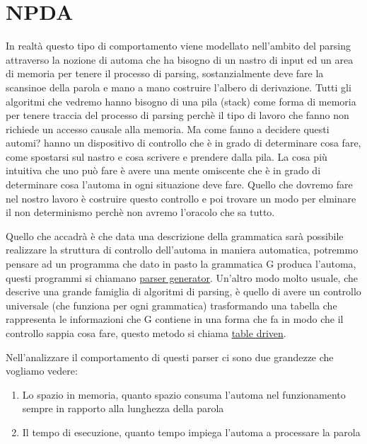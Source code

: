 \section{NPDA}
In realtà questo tipo di comportamento viene modellato nell'ambito del parsing attraverso la nozione di automa che ha bisogno di un nastro di input ed un area di memoria per tenere il processo di parsing, sostanzialmente deve fare la scansinoe della parola e mano a mano costruire l'albero di derivazione. Tutti gli algoritmi che vedremo hanno bisogno di una pila (stack) come forma di memoria per tenere traccia del processo di parsing perchè il tipo di lavoro che fanno non richiede un accesso causale alla memoria. Ma come fanno a decidere questi automi? hanno un dispositivo di controllo che è in grado di determinare cosa fare, come spostarsi sul nastro e cosa scrivere e prendere dalla pila. La cosa più intuitiva che uno può fare è avere una mente omiscente che è in grado di determinare cosa l'automa in ogni situazione deve fare. Quello che dovremo fare nel nostro lavoro è costruire questo controllo e poi trovare un modo per elminare il non determinismo perchè non avremo l'oracolo che sa tutto.

Quello che accadrà è che data una descrizione della grammatica sarà possibile realizzare la struttura di controllo dell'automa in maniera automatica, potremmo pensare ad un programma che dato in pasto la grammatica G produca l'automa, questi programmi si chiamano \underline{parser generator}.
Un'altro modo molto usuale, che descrive una grande famiglia di algoritmi di parsing, è quello di avere un controllo universale (che funziona per ogni grammatica) trasformando una tabella che rappresenta le informazioni che G contiene in una forma che fa in modo che il controllo sappia cosa fare, questo metodo si chiama \underline{table driven}.

Nell'analizzare il comportamento di questi parser ci sono due grandezze che vogliamo vedere:
\begin{enumerate}
    \item Lo spazio in memoria, quanto spazio consuma l'automa nel funzionamento sempre in rapporto alla lunghezza della parola
    \item Il tempo di esecuzione, quanto tempo impiega l'automa a processare la parola
\end{enumerate}


